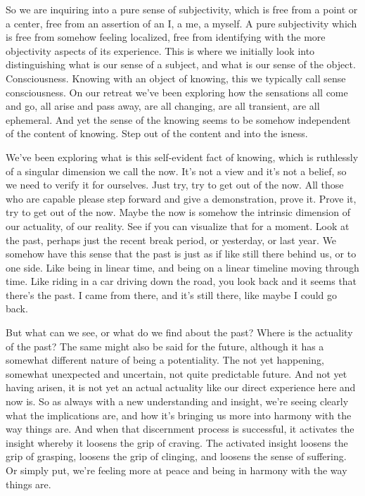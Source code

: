 \documentclass[12pt,openany]{book}
\begin{document}
So we are inquiring into a pure sense of subjectivity, which is free from a point or a center, free from an assertion of an I, a me, a myself. A pure subjectivity which is free from somehow feeling localized, free from identifying with the more objectivity aspects of its experience. This is where we initially look into distinguishing what is our sense of a subject, and what is our sense of the object. Consciousness. Knowing with an object of knowing, this we typically call sense consciousness. On our retreat we've been exploring how the sensations all come and go, all arise and pass away, are all changing, are all transient, are all ephemeral. And yet the sense of the knowing seems to be somehow independent of the content of knowing. Step out of the content and into the isness.

We've been exploring what is this self-evident fact of knowing, which is ruthlessly of a singular dimension we call the now. It's not a view and it's not a belief, so we need to verify it for ourselves. Just try, try to get out of the now. All those who are capable please step forward and give a demonstration, prove it. Prove it, try to get out of the now. Maybe the now is somehow the intrinsic dimension of our actuality, of our reality. See if you can visualize that for a moment. Look at the past, perhaps just the recent break period, or yesterday, or last year. We somehow have this sense that the past is just as if like still there behind us, or to one side. Like being in linear time, and being on a linear timeline moving through time. Like riding in a car driving down the road, you look back and it seems that there's the past. I came from there, and it's still there, like maybe I could go back.

But what can we see, or what do we find about the past? Where is the actuality of the past? The same might also be said for the future, although it has a somewhat different nature of being a potentiality. The not yet happening, somewhat unexpected and uncertain, not quite predictable future. And not yet having arisen, it is not yet an actual actuality like our direct experience here and now is. So as always with a new understanding and insight, we're seeing clearly what the implications are, and how it's bringing us more into harmony with the way things are. And when that discernment process is successful, it activates the insight whereby it loosens the grip of craving. The activated insight loosens the grip of grasping, loosens the grip of clinging, and loosens the sense of suffering. Or simply put, we're feeling more at peace and being in harmony with the way things are.
\end{document}
